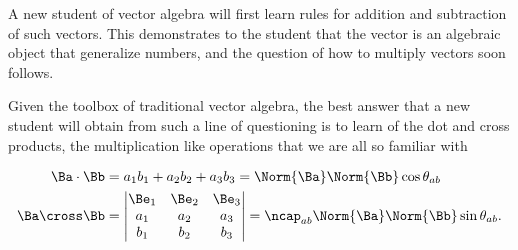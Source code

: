 %
%
A new student of vector algebra will first learn
%
%
%
%
rules for addition and subtraction of such vectors.
This demonstrates to the student that the vector is an algebraic object that generalize numbers, and the question of how to
multiply vectors soon follows.

Given the toolbox of traditional vector algebra, the best answer that a new student will obtain from such a line of questioning is to learn of the dot and cross products, the multiplication like operations that we are all so familiar with


\begin{dmath}\label{eqn:GAmotivation:60}
\begin{aligned}
\Ba \cdot \Bb &= a_1 b_1 + a_2 b_2 + a_3 b_3 = \Norm{\Ba} \Norm{\Bb} \cos \theta_{ab} \\
\Ba \cross \Bb &=
\begin{vmatrix}
\Be_1 & \Be_2 & \Be_3 \\
a_1 & a_2 & a_3 \\
b_1 & b_2 & b_3 \\
\end{vmatrix}
= \ncap_{ab} \Norm{\Ba} \Norm{\Bb} \sin\theta_{ab}.
\end{aligned}
\end{dmath}

